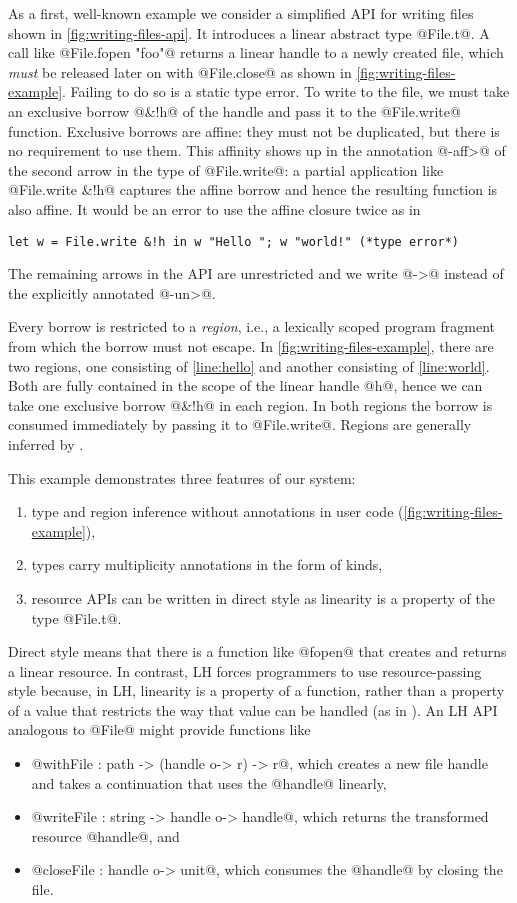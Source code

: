 As a first, well-known example we consider a simplified API for
writing files shown in \cref{fig:writing-files-api}.  It introduces a
linear abstract type @File.t@. A call like
@File.fopen "foo"@ returns a linear handle to a newly created
file, which \emph{must} be released later on with @File.close@
as shown in \cref{fig:writing-files-example}. Failing to do so is a
static type error.  To write to the file, we must take an exclusive
borrow @&!h@ of the handle and pass it to the
@File.write@ function. Exclusive borrows are affine:
they must not be duplicated, but there is no requirement to use
them. This affinity shows up in the annotation @-{aff}>@ of the second arrow in
the type of @File.write@: a partial application like
@File.write &!h@ captures the affine borrow and hence the
resulting function is also affine. It
would be an error to use the affine closure twice as in
\begin{lstlisting}
let w = File.write &!h in w "Hello "; w "world!" (*type error*)
\end{lstlisting}
The remaining arrows in
the API are unrestricted and we write @->@ instead of the
explicitly annotated @-{un}>@.

Every borrow is restricted to a \emph{region}, i.e., a lexically
scoped program fragment from which the borrow must not escape. In
\cref{fig:writing-files-example}, there are two regions, one 
consisting of \cref{line:hello} and another consisting of
\cref{line:world}. Both are fully contained in the scope of the linear
handle @h@, hence we can take one exclusive borrow @&!h@ in each
region. In both regions the borrow is consumed immediately by passing
it to @File.write@. Regions are generally inferred by \lang.

This example demonstrates three features of our system:
\begin{enumerate}
\item type and region inference without annotations in user code (\cref{fig:writing-files-example}),
\item types carry multiplicity annotations in the form of kinds,
\item resource APIs can be written in direct style as linearity is a
  property of the type @File.t@.
\end{enumerate}

Direct style means that there is a function like @fopen@ that creates
and returns a linear resource. In contrast, LH forces programmers to
use resource-passing style because, in LH, linearity is a property of
a function, rather than a property of a value that restricts the way
that value can be handled (as in \lang). An LH API analogous to @File@
might provide functions like
\begin{itemize}
\item @withFile : path -> (handle o-> r) -> r@, which creates a new
  file handle and takes a continuation that uses the @handle@ linearly,
\item @writeFile : string -> handle o-> handle@, which
  returns the transformed resource @handle@, and
\item @closeFile : handle o-> unit@, which consumes the @handle@ by
  closing the file.
\end{itemize}

